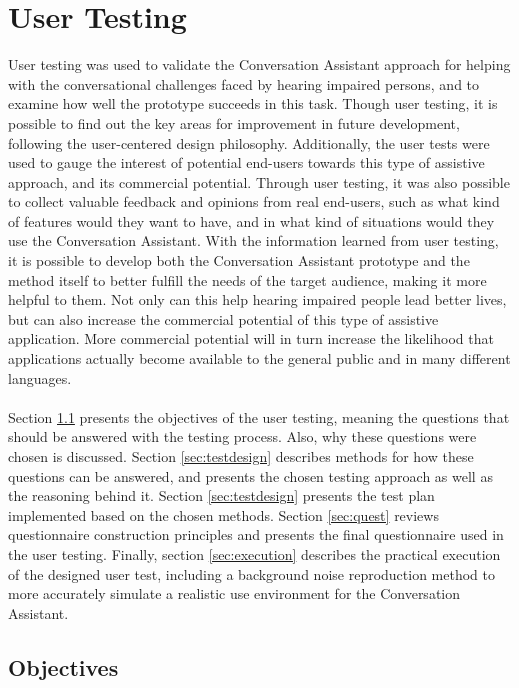 \documentclass[english, 12pt, a4paper, pdftex, elec, utf8]{aaltothesis}
\begin{document}
\clearpage

\section{User Testing} \label{sec:testing}

User testing was used to validate the Conversation Assistant approach for helping with the conversational challenges faced by hearing impaired persons, and to examine how well the prototype succeeds in this task. Though user testing, it is possible to find out the key areas for improvement in future development, following the user-centered design philosophy. Additionally, the user tests were used to gauge the interest of potential end-users towards this type of assistive approach, and its commercial potential. Through user testing, it was also possible to collect valuable feedback and opinions from real end-users, such as what kind of features would they want to have, and in what kind of situations would they use the Conversation Assistant. With the information learned from user testing, it is possible to develop both the Conversation Assistant prototype and the method itself  to better fulfill the needs of the target audience, making it more helpful to them. Not only can this help hearing impaired people lead better lives, but can also increase the commercial potential of this type of assistive application. More commercial potential will in turn increase the likelihood that applications actually become available to the general public and in many different languages. \\\\
Section \ref{sec:objectives} presents the objectives of the user testing, meaning the questions that should be answered with the testing process. Also, why these questions were chosen is discussed. Section \ref{sec:testdesign} describes methods for how these questions can be answered, and presents the chosen testing approach as well as the reasoning behind it. Section \ref{sec:testdesign} presents the test plan implemented based on the chosen methods. Section \ref{sec:quest} reviews questionnaire construction principles and presents the final questionnaire used in the user testing. Finally, section \ref{sec:execution} describes the practical execution of the designed user test, including a background noise reproduction method to more accurately simulate a realistic use environment for the Conversation Assistant.
 
\subsection{Objectives} \label{sec:objectives}
\end{document}
